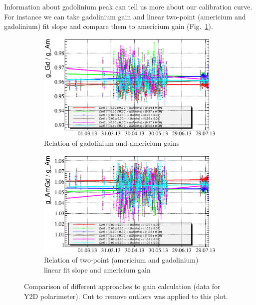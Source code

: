 \documentclass[a4paper,12pt]{article}
\begin{document}
Information about gadolinium peak can tell us more about our calibration curve.
For instance we can take gadolinium gain and linear two-point (americium and gadolinium) fit slope
 and compare them to americium gain (Fig.~\ref{fig:gain_relations}).

\begin{figure}[p]
\begin{subfigure}[b]{0.5\textwidth}
\includegraphics[width=\textwidth]{gfx/run13_alpha_study/Y2U/c_chGdGain_over_AmGain_by_day_Y2U.eps}
\caption{Relation of gadolinium and americium gains}
\end{subfigure}
\begin{subfigure}[b]{0.5\textwidth}
\includegraphics[width=\textwidth]{gfx/run13_alpha_study/Y2U/c_chAmGdGain_over_AmGain_by_day_Y2U.eps}
\caption{Relation of two-point (americium and gadolinium) linear fit slope and americium gain}
\end{subfigure}
\caption{Comparison of different approaches to gain calculation (data for Y2D polarimeter).
Cut to remove outliers was applied to this plot.}
\label{fig:gain_relations}
\end{figure}
\end{document}
